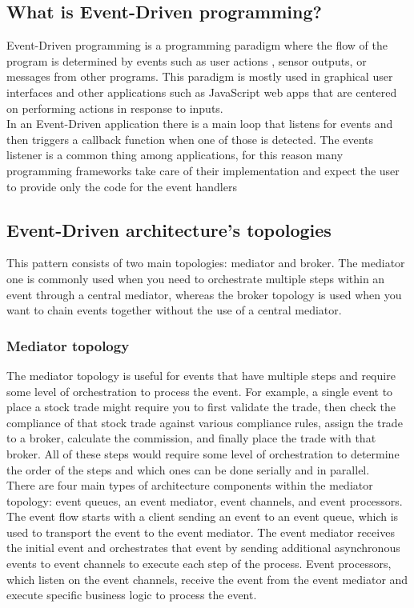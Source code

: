 \documentclass[11pt]{article} %
\begin{document}
\subsection{What is Event-Driven programming?}
Event-Driven programming is a programming paradigm where the flow of the program is determined by events such as user actions , sensor outputs, or messages from other programs. This paradigm is mostly used in graphical user interfaces and other applications such as JavaScript web apps that are centered on performing actions in response to inputs. \\
In an Event-Driven application there is a main loop that listens for events and then triggers a callback function when one of those is detected. The events listener is a common thing among applications, for this reason many programming frameworks take care of their implementation and expect the user to provide only the code for the event handlers  

\subsection{Event-Driven architecture's topologies}
This pattern consists of two main topologies: mediator and broker. The mediator one is commonly used when you need to orchestrate multiple steps within an event through a central mediator, whereas the broker topology is used when you want to chain events together without the use of a central mediator.

\subsubsection{Mediator topology}
The mediator topology is useful for events that have multiple steps and require some level of orchestration to process the event. For example, a single event to place a stock trade might require you to first validate the trade, then check the compliance of that stock trade against various compliance rules, assign the trade to a broker, calculate the commission, and finally place the trade with that broker. All of these steps would require some level of orchestration to determine the order of the steps and which ones can be done serially and in parallel. \\
There are four main types of architecture components within the mediator topology: event queues, an event mediator, event channels, and event processors. The event flow starts with a client sending an event to an event queue, which is used to transport the event to the event mediator. The event mediator receives the initial event and orchestrates that event by sending additional asynchronous events to event channels to execute each step of the process. Event processors, which listen on the event channels, receive the event from the event mediator and execute specific business logic to process the event.
\end{document}
